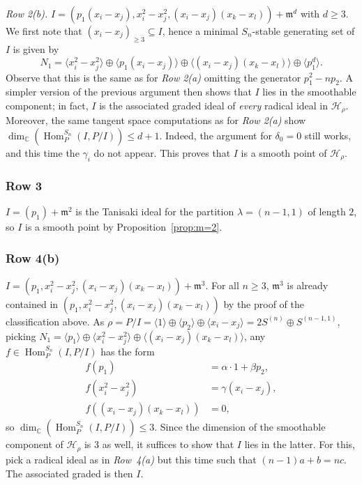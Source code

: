 \documentclass[11pt]{amsart}
\theoremstyle{definition}
\newcommand{\CC}{\mathbb{C}}
\newcommand{\mm}{\mathfrak{m}}
\newcommand{\HH}{\mathcal{H}}
\DeclareMathOperator{\Hom}{Hom}
\begin{document}
\medskip
\emph{Row 2(b).} $I = (p_1(x_i-x_j),x_i^2-x_j^2,(x_i-x_j)(x_k-x_l)) + \mm^{d}$ with $d \geq 3$. We first note that $(x_i-x_j)_{\geq 3} \subseteq I$, hence a minimal $S_n$-stable generating set of $I$ is given by
\begin{equation*}
    N_1 = \langle x_i^2 - x_j^2 \rangle \oplus \langle p_1(x_i - x_j)  \rangle \oplus \langle (x_i - x_j)(x_k - x_l) \rangle \oplus \langle p_1^d \rangle.
\end{equation*}
Observe that this is the same as for \emph{Row 2(a)} omitting the generator $p_1^2 - n p_2$. A simpler version of the previous argument then shows that $I$ lies in the smoothable component; in fact, $I$ is the associated graded ideal of \emph{every} radical ideal in $\HH_\rho$. Moreover, the same tangent space computations as for \emph{Row 2(a)} show $\dim_\CC(\Hom^{S_n}_P(I,P/I)) \leq d+1$. Indeed, the argument for $\delta_0 = 0$ still works, and this time the $\gamma_i$ do not appear. This proves that $I$ is a smooth point of $\HH_\rho$.

\subsubsection{Row 3} $I = (p_1) + \mm^2$ is the Tanisaki ideal for the partition $\lambda = (n-1,1)$ of length $2$, so $I$ is a smooth point by Proposition~\ref{prop:m=2}.

\medskip
\subsubsection{Row 4(b)} $I = (p_1,x_i^2-x_j^2,(x_i-x_j)(x_k-x_l)) + \mm^3$. For all $n \geq 3$, $\mm^3$ is already contained in $(p_1,x_i^2-x_j^2,(x_i-x_j)(x_k-x_l))$ by the proof of the classification above. As $\rho = P/I = \langle 1 \rangle \oplus \langle p_2 \rangle \oplus \langle x_i - x_j \rangle = 2S^{(n)} \oplus S^{(n-1,1)}$, picking $N_1 = \langle p_1 \rangle \oplus \langle x_i^2 - x_j^2 \rangle \oplus \langle (x_i - x_j)(x_k - x_l) \rangle$, any $f \in \Hom^{S_n}_{P}(I,P/I)$ has the form
\begin{align*}
    f(p_1) &= \alpha \cdot 1 + \beta p_2, \\
    f(x_i^2 - x_j^2) &= \gamma (x_i - x_j), \\
    f((x_i-x_j)(x_k-x_l)) &= 0,
\end{align*}
so $\dim_\CC(\Hom^{S_n}_P(I,P/I)) \leq 3$. Since the dimension of the smoothable component of $\HH_\rho$ is $3$ as well, it suffices to show that $I$ lies in the latter. For this, pick a radical ideal as in \emph{Row~4(a)} but this time such that $(n-1)a+b = nc$. The associated graded is then $I$.
\end{document}

